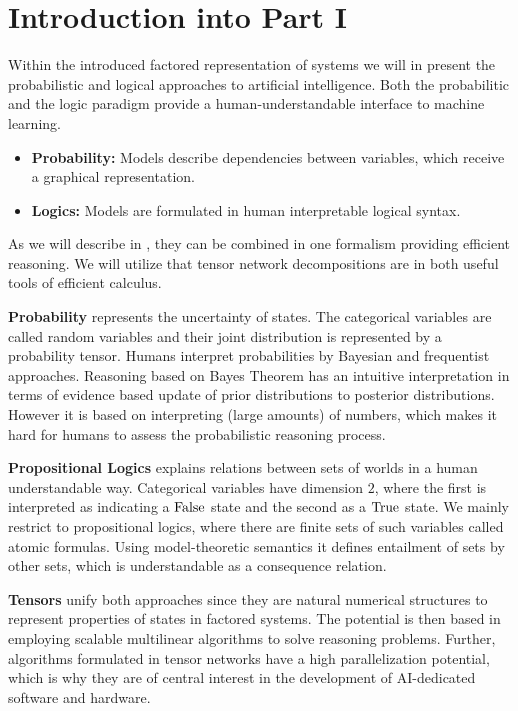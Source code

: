 \chapter{Introduction into Part I}

Within the introduced factored representation of systems we will in  present the probabilistic and logical approaches to artificial intelligence.
Both the probabilitic and the logic paradigm provide a human-understandable interface to machine learning.
\begin{itemize}
    \item \textbf{Probability:} Models describe dependencies between variables, which receive a graphical representation.
    \item \textbf{Logics:} Models are formulated in human interpretable logical syntax.
\end{itemize}
As we will describe in , they can be combined in one formalism providing efficient reasoning.
We will utilize that tensor network decompositions are in both useful tools of efficient calculus.

\textbf{Probability} represents the uncertainty of states.
The categorical variables are called random variables and their joint distribution is represented by a probability tensor.
Humans interpret probabilities by Bayesian and frequentist approaches.
Reasoning based on Bayes Theorem has an intuitive interpretation in terms of evidence based update of prior distributions to posterior distributions.
However it is based on interpreting (large amounts) of numbers, which makes it hard for humans to assess the probabilistic reasoning process.

\textbf{Propositional Logics} explains relations between sets of worlds in a human understandable way.
Categorical variables have dimension $2$, where the first is interpreted as indicating a $\mathrm{False}$ state and the second as a $\mathrm{True}$ state.
We mainly restrict to propositional logics, where there are finite sets of such variables called atomic formulas.
Using model-theoretic semantics it defines entailment of sets by other sets, which is understandable as a consequence relation.

\textbf{Tensors} unify both approaches since they are natural numerical structures to represent properties of states in factored systems.
The potential is then based in employing scalable multilinear algorithms to solve reasoning problems.
Further, algorithms formulated in tensor networks have a high parallelization potential, which is why they are of central interest in the development of AI-dedicated software and hardware.


